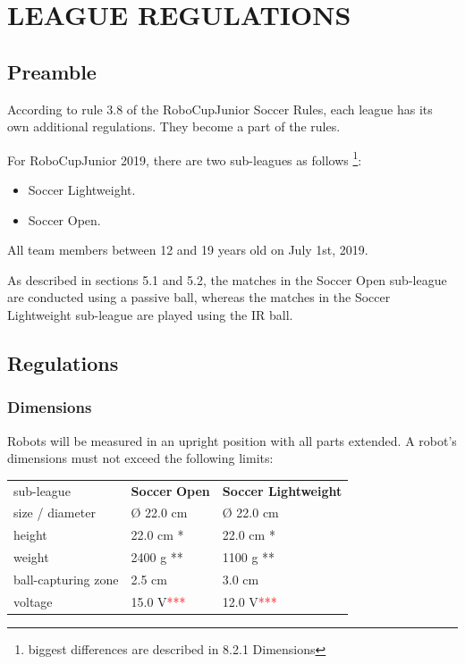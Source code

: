 \documentclass{article}
\begin{document}
\section{LEAGUE REGULATIONS \label{section:league_regulations}}

\subsection{ Preamble \label{ref-053}}

According to rule 3.8 of the RoboCupJunior Soccer Rules, each league has its
own additional regulations. They become a part of the rules.

For RoboCupJunior 2019, there are two sub-leagues as follows
\footnote{biggest differences are described in 8.2.1 Dimensions}:

\begin{itemize}

\item Soccer Lightweight.

\item Soccer Open.

\end{itemize}

All team members between 12 and 19 years old on July 1st, 2019.

As described in sections 5.1 and 5.2, the matches in the Soccer Open sub-league
are conducted using a passive ball, whereas the matches in the Soccer
Lightweight sub-league are played using the IR ball.

\subsection{Regulations \label{ref-054}}

\subsubsection{Dimensions \label{ref-055}}

Robots will be measured in an upright position with all parts extended. A
robot's dimensions must not exceed the following limits:

\begin{table}
\begin{tabularx}{\textwidth}{
p{}
p{}
p{}}
sub-league & \textbf{Soccer} \textbf{Open} & \textbf{Soccer Lightweight} \\
size / diameter & \O{} 22.0 cm & \O{} 22.0 cm \\
height & 22.0 cm * & 22.0 cm * \\
weight & 2400 g ** & 1100 g ** \\
ball-capturing zone & 2.5 cm & 3.0 cm \\
voltage & 15.0 V\textcolor{red}{***} & 12.0 V\textcolor{red}{***} \\

\end{tabularx}

\end{table}
\end{document}
